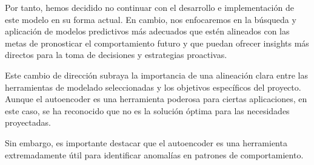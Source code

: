 Por tanto, hemos decidido no continuar con el desarrollo e implementación de este modelo en su forma actual. En cambio, nos enfocaremos en la búsqueda y aplicación de modelos predictivos más adecuados que estén alineados con las metas de pronosticar el comportamiento futuro y que puedan ofrecer insights más directos para la toma de decisiones y estrategias proactivas.

Este cambio de dirección subraya la importancia de una alineación clara entre las herramientas de modelado seleccionadas y los objetivos específicos del proyecto. Aunque el autoencoder es una herramienta poderosa para ciertas aplicaciones, en este caso, se ha reconocido que no es la solución óptima para las necesidades proyectadas.

Sin embargo, es importante destacar que el autoencoder es una herramienta extremadamente útil para identificar anomalías en patrones de comportamiento.
